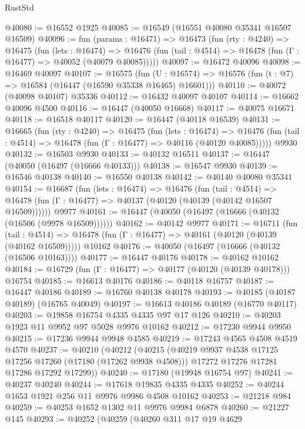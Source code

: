 \begin{lexlean}{RustStd}
\begin{coremodule}
@40080 := @16552 @1925
@40085 := @16549 (@16551 @40080 @35341 @16507 @16509)
@40096 := fun (params : @16471) =>
  @16473
    (fun (rty : @4240) =>
    @16475
      (fun (lets : @16474) =>
      @16476 (fun (tail : @4514) => @16478 (fun (Γ : @16477) => @40052 (@40079 @40085)))))
@40097 := @16472 @40096
@40098 := @16469 @40097
@40107 := @16575
    (fun (U : @16574) => @16576 (fun (t : @7) => @16584 (@16447 (@16590 @35338 @16465) @16601)))
@40110 := @40072 (@40098 @40107) @35336
@40112 := @16432 @40097 @40107
@40114 := @16662 @40096 @4500
@40116 := @16447 (@40050 @16668)
@40117 := @40075 @16671
@40118 := @16518 @40117
@40120 := @16447 (@40118 @16539)
@40131 := @16665
    (fun (rty : @4240) =>
    @16475
      (fun (lets : @16474) =>
      @16476 (fun (tail : @4514) => @16478 (fun (Γ : @16477) => @40116 (@40120 @40085)))))
    @9930
@40132 := @16503 @9930
@40133 := @40132 @16511
@40137 := @16447 (@40050 (@16497 (@16666 @40133)))
@40138 := @16547 @9930
@40139 := @16546 @40138
@40140 := @16550 @40138
@40142 := @40140 @40080 @35341
@40154 := @16687
    (fun (lets : @16474) =>
    @16476
      (fun (tail : @4514) =>
      @16478 (fun (Γ : @16477) => @40137 (@40120 (@40139 (@40142 @16507 @16509))))))
    @9977
@40161 := @16447 (@40050 (@16497 (@16666 (@40132 (@16506 (@9978 @16509))))))
@40162 := @40142 @9977
@40171 := @16711
    (fun (tail : @4514) => @16478 (fun (Γ : @16477) => @40161 (@40120 (@40139 (@40162 @16509)))))
    @10162
@40176 := @40050 (@16497 (@16666 (@40132 (@16506 @10163))))
@40177 := @16447 @40176
@40178 := @40162 @10162
@40184 := @16729 (fun (Γ : @16477) => @40177 (@40120 (@40139 @40178))) @16754
@40185 := @16613 @40176
@40186 := @40118 @16757
@40187 := @16447 @40186
@40189 := @16760 @40138 @40178
@40193 := @40185 (@40187 @40189) (@16765 @40049)
@40197 := @16613 @40186 @40189 (@16770 @40117)
@40203 := @19858 @16754 @4335 @4335 @97 @17 @126
@40210 := @40203 @1923 @11 @9952 @97 @5028 @9976 @10162
@40212 := @17230 @9944 @9950
@40215 := @17236 @9944 @9948 @4585
@40219 := @17243 @4565 @4508 @4519 @4570
@40237 := @40210
    (@40212
      (@40215
        (@40219 @9937 @4538 @17125 @17256 @17260 (@17180 (@17262 @9938 @4508)))
        @17272
        @17276
        @17281
        @17286
        @17292
        @17299))
@40240 := @17180 (@19948 @16754 @97)
@40241 := @40237 @40240
@40244 := @17618 @19835 @4335 @4335
@40252 := @40244 @1653 @1921 @256 @11 @9976 @9986 @4508 @10162
@40253 := @21218 @984
@40259 := @40253 @1652 @1302 @11 @9976 @9984 @6878
@40260 := @21227 @145
@40293 := @40252
    (@40259
      (@40260
        @311
        @17
        @19
        @4629

\end{coremodule}
\end{lexlean}
